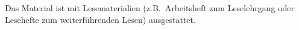 Das Material ist mit Lesematerialien (z.B.\ Arbeitsheft zum Leselehrgang oder Lesehefte zum weiterführenden Lesen) ausgestattet.